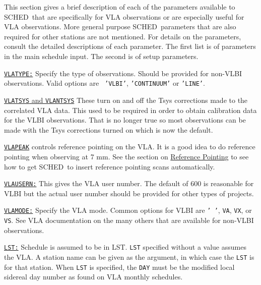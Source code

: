 \documentclass{report}
\newcommand{\schedb}{{\sc SCHED~}}
\begin{document}
This section gives a brief description of each of the parameters
available to \schedb that are specifically for VLA observations or
are especially useful for VLA observations.  More general purpose
\schedb parameters that are also required for other stations are
not mentioned.  For details on the parameters, consult
the detailed descriptions of each parameter.  The first list
is of parameters in the main schedule input.  The second is of
setup parameters.

\begin{list}{}{\parsep 0em  \itemsep 0em }

\item 
{\hyperref[MP:VLATYPE]{{\tt VLATYPE:}}} Specify the type of observations.
Should be provided for non-VLBI observations. Valid options are {\tt
'VLBI'}, {\tt 'CONTINUUM'} or {\tt 'LINE'}.

\item 
{\hyperref[MP:VLATSYS]{{\tt VLATSYS} and {\tt VLANTSYS}}} These turn on
and off the Tsys corrections made to the correlated VLA data. This
used to be required in order to obtain calibration data for the VLBI
observations. That is no longer true so most observations can be made
with the Tsys corrections turned on which is now the default.

\item 
{\hyperref[MP:VLAPEAK]{{\tt VLAPEAK}}} controls reference pointing
on the VLA.  It is a good idea to do reference pointing when
observing at 7 mm.  See the section on 
{\hyperref[SEC:REFPOINT]{Reference Pointing}}
to see how to get \schedb to insert reference pointing
scans automatically.

\item 
{\hyperref[MP:VLAUSERN]{{\tt VLAUSERN:}}} This gives the VLA user
number. The default of 600 is reasonable for VLBI but the actual user
number should be provided for other types of projects.

\item 
{\hyperref[MP:VLAMODE]{{\tt VLAMODE:}}} Specify the VLA mode.
Common options for VLBI are {\tt ' '}, {\tt VA}, {\tt VX}, or {\tt
VS}. See VLA documentation on the many others that are available
for non-VLBI observations.

\item 
{\hyperref[MP:LST]{{\tt LST:}}} Schedule is assumed to be in LST. {\tt LST}
specified without a value assumes the VLA. A station name can be given
as the argument, in which case the {\tt LST} is for that station. When
{\tt LST} is specified, the {\tt DAY} must be the modified local
sidereal day number as found on VLA monthly schedules.


\end{list}
\end{document}
